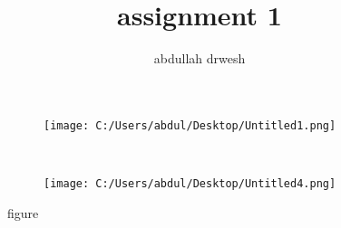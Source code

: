 \documentclass{article}
\title{assignment 1}
\author{abdullah drwesh}
\begin{document}
	\maketitle
	\begin{figure}[!h] %
		\centering
		\label{fig:figure1}
		\begin{subfigure}[b]{0.4\columnwidth} %
			\texttt{[image: C:/Users/abdul/Desktop/Untitled1.png]}
			\caption{}
		\end{subfigure}
	~
		\begin{subfigure}[b]{0.4\columnwidth}
			\texttt{[image: C:/Users/abdul/Desktop/Untitled4.png]}
			\caption{}
		\end{subfigure}
	\caption{figure}
	\end{figure}
\end{document}
